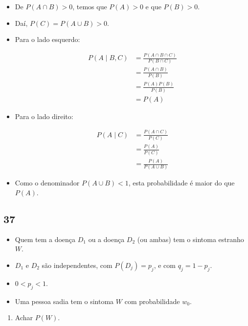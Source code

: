 \documentclass[
  11pt]{report}
\providecommand{\tightlist}{%
  \setlength{\itemsep}{0pt}\setlength{\parskip}{0pt}}
\begin{document}
\begin{itemize}
\item
  De $P(A \cap B) > 0$, temos que $P(A) > 0$ e que $P(B) > 0$.
\item
  Daí, $P(C) = P(A \cup B) > 0$.
\item
  Para o lado esquerdo:

  \[
  \begin{aligned}
  P(A \mid B, C) 
  &= \frac{P(A \cap B \cap C)}{P(B \cap C)} \\
  &= \frac{P(A \cap B)}{P(B)} \\
  &= \frac{P(A)P(B)}{P(B)} \\
  &= P(A)
  \end{aligned}
  \]
\item
  Para o lado direito:

  \[
  \begin{aligned}
  P(A \mid C) 
  &= \frac{P(A \cap C)}{P(C)} \\
  &= \frac{P(A)}{P(C)} \\
  &= \frac{P(A)}{P(A \cup B)} 
  \end{aligned}
  \]
\item
  Como o denominador $P(A \cup B) < 1$, esta probabilidade é maior do que $P(A)$.
\end{itemize}

\hypertarget{section-20}{%
\subsection*{37}\label{section-20}}

\begin{rmdbox}

\begin{itemize}
\item
  Quem tem a doença $D_1$ ou a doença $D_2$ (ou ambas) tem o sintoma estranho $W$.
\item
  $D_1$ e $D_2$ são independentes, com $P(D_j) = p_j$, e com $q_j = 1 - p_j$.
\item
  $0 < p_j < 1$.
\item
  Uma pessoa sadia tem o sintoma $W$ com probabilidade $w_0$.
\end{itemize}

\end{rmdbox}

\begin{rmdbox}

\begin{enumerate}
\def\labelenumi{\alph{enumi}.}
\tightlist
\item
  Achar $P(W)$.
\end{enumerate}

\end{rmdbox}
\end{document}
